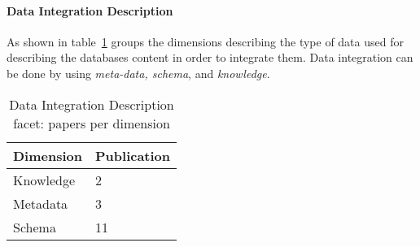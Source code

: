 \paragraph{Data Integration Description}
 As shown in table~\ref{table:didesc} groups the dimensions describing the type of data used for describing the databases content in order to  integrate them. Data integration can be done by using {\em meta-data, schema}, and {\em knowledge}.

\begin{table}[!h]
\begin{center}
\begin{tabular}{p{4cm}p{4cm}}
\hline 
\textbf{Dimension} & \textbf{Publication} \\ 
\hline 
Knowledge & 2 \\ 
\hline 
Metadata & 3 \\ 
\hline 
Schema & 11 \\ 
\hline 
\end{tabular}
\end{center}
\caption{Data Integration Description facet: papers per dimension}\label{table:didesc}
\end{table}

